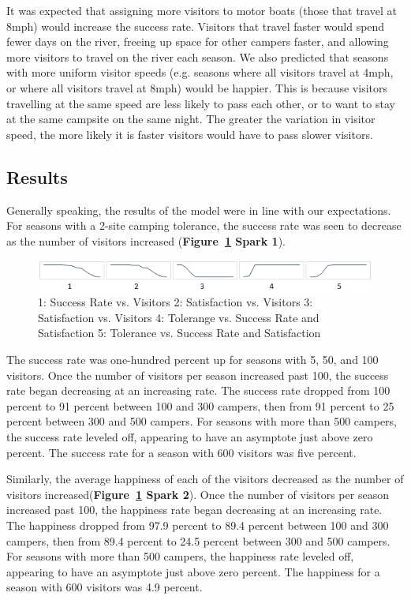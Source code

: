 \documentclass[11pt]{article} %
\begin{document}
It was expected that assigning more visitors to motor boats (those that travel
at 8mph) would increase the success rate. Visitors that travel faster would
spend fewer days on the river, freeing up space for other campers faster,
and allowing more visitors to travel on the river each season. We also
predicted that seasons with more uniform visitor speeds (e.g. seasons where
all visitors travel at 4mph, or where all visitors travel at 8mph) would be
happier. This is because visitors travelling at the same speed are less likely
to pass each other, or to want to stay at the same campsite on the same night.
The greater the variation in visitor speed, the more likely it is faster
visitors would have to pass slower visitors.

\subsection{Results}
\label{sec:results}
Generally speaking, the results of the model were in line with our
expectations. For seasons with a 2-site camping tolerance, the success rate
was seen to decrease as the number of visitors increased
(\textbf{Figure~\ref{fig:sparklines} Spark 1}).

\begin{figure}[b]
  \centering
  \includegraphics[scale=.9]{imgs/sparklines.png}
  \caption{1: Success Rate vs. Visitors 2: Satisfaction
    vs. Visitors 3: Satisfaction vs. Visitors
    4: Tolerange vs. Success Rate and Satisfaction 5: Tolerance vs. Success Rate and Satisfaction}
  \label{fig:sparklines}
\end{figure}

The success rate was one-hundred percent up for seasons with 5, 50, and 100
visitors. Once the number of visitors per season increased past 100, the
success rate began decreasing at an increasing rate. The success rate
dropped from 100 percent to 91 percent between 100 and 300 campers, then
from 91 percent to 25 percent between 300 and 500 campers. For seasons with
more than 500 campers, the success rate leveled off, appearing to have an
asymptote just above zero percent. The success rate for a season with 600
visitors was five percent.

Similarly, the average happiness of each of the visitors decreased as the
number of visitors increased(\textbf{Figure~\ref{fig:sparklines} Spark 2}).
Once the number of visitors per season increased past 100, the
happiness rate began decreasing at an increasing rate. The happiness dropped
from 97.9 percent to 89.4 percent between 100 and 300 campers, then from 89.4
percent to 24.5 percent between 300 and 500 campers. For seasons with more
than 500 campers, the happiness rate leveled off, appearing to have an
asymptote just above zero percent. The happiness for a season with 600 visitors
was 4.9 percent.
\end{document}
